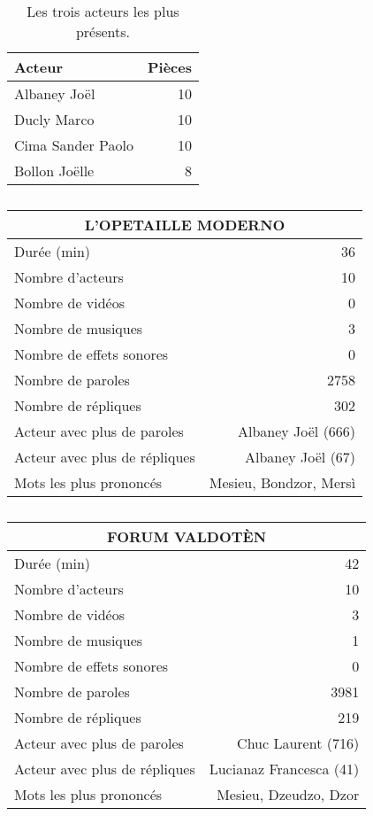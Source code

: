\begin{table}[]
\centering
\caption{Les trois acteurs les plus présents.}
\begin{tabular}{lr}
    \toprule
\multicolumn{1}{l}{\textbf{Acteur}} & \textbf{Pièces} \\
    \midrule
\multicolumn{1}{l}{Albaney Joël} &10\\
\multicolumn{1}{l}{Ducly Marco} &10\\
\multicolumn{1}{l}{Cima Sander Paolo} &10\\
\multicolumn{1}{l}{Bollon Joëlle} &8\\
\bottomrule
\end{tabular}%
\end{table}
\newpage
    \begin{table}[]
    \centering
    \caption{}
    \begin{tabular}{lr}\toprule\multicolumn{2}{c}{L’OPETAILLE MODERNO} \\\midrule
\multicolumn{1}{l}{Durée (min)}&36\\
\multicolumn{1}{l}{Nombre d'acteurs}&10\\
\multicolumn{1}{l}{Nombre de vidéos}&0\\
\multicolumn{1}{l}{Nombre de musiques}&3\\
\multicolumn{1}{l}{Nombre de effets sonores}&0\\
\multicolumn{1}{l}{Nombre de paroles}&2758\\
\multicolumn{1}{l}{Nombre de répliques}&302\\
\multicolumn{1}{l}{Acteur avec plus de paroles}&Albaney Joël (666)\\
\multicolumn{1}{l}{Acteur avec plus de répliques}&Albaney Joël (67)\\
\multicolumn{1}{l}{Mots les plus prononcés}&Mesieu, Bondzor, Mersì\\
    \bottomrule
    \end{tabular}%
    \end{table}
    \begin{table}[]
    \centering
    \caption{}
    \begin{tabular}{lr}\toprule\multicolumn{2}{c}{FORUM VALDOTÈN} \\\midrule
\multicolumn{1}{l}{Durée (min)}&42\\
\multicolumn{1}{l}{Nombre d'acteurs}&10\\
\multicolumn{1}{l}{Nombre de vidéos}&3\\
\multicolumn{1}{l}{Nombre de musiques}&1\\
\multicolumn{1}{l}{Nombre de effets sonores}&0\\
\multicolumn{1}{l}{Nombre de paroles}&3981\\
\multicolumn{1}{l}{Nombre de répliques}&219\\
\multicolumn{1}{l}{Acteur avec plus de paroles}&Chuc Laurent (716)\\
\multicolumn{1}{l}{Acteur avec plus de répliques}&Lucianaz Francesca (41)\\
\multicolumn{1}{l}{Mots les plus prononcés}&Mesieu, Dzeudzo, Dzor\\
    \bottomrule
    \end{tabular}%
    \end{table}
